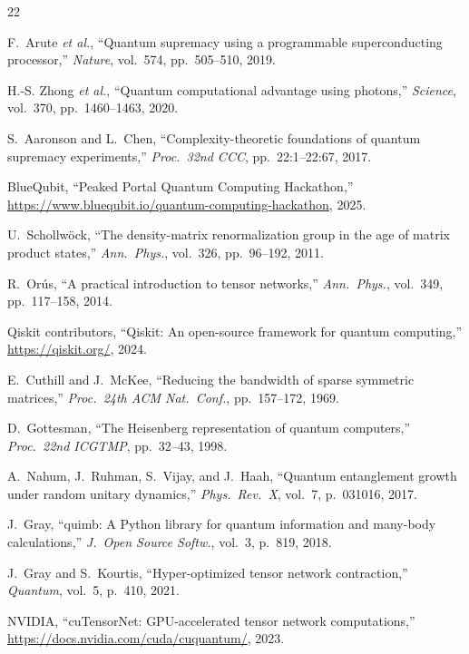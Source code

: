\documentclass[11pt,a4paper]{article}
\begin{document}
\begin{thebibliography}{22}

F.~Arute \emph{et al.},
``Quantum supremacy using a programmable superconducting processor,''
\emph{Nature}, vol.~574, pp.~505--510, 2019.

H.-S. Zhong \emph{et al.},
``Quantum computational advantage using photons,''
\emph{Science}, vol.~370, pp.~1460--1463, 2020.

S.~Aaronson and L.~Chen,
``Complexity-theoretic foundations of quantum supremacy experiments,''
\emph{Proc.\ 32nd CCC}, pp.~22:1--22:67, 2017.

BlueQubit,
``Peaked Portal Quantum Computing Hackathon,''
\url{https://www.bluequbit.io/quantum-computing-hackathon}, 2025.

U.~Schollw{\"o}ck,
``The density-matrix renormalization group in the age of matrix product states,''
\emph{Ann.\ Phys.}, vol.~326, pp.~96--192, 2011.

R.~Or{\'u}s,
``A practical introduction to tensor networks,''
\emph{Ann.\ Phys.}, vol.~349, pp.~117--158, 2014.

Qiskit contributors,
``Qiskit: An open-source framework for quantum computing,''
\url{https://qiskit.org/}, 2024.

E.~Cuthill and J.~McKee,
``Reducing the bandwidth of sparse symmetric matrices,''
\emph{Proc.\ 24th ACM Nat.\ Conf.}, pp.~157--172, 1969.

D.~Gottesman,
``The Heisenberg representation of quantum computers,''
\emph{Proc.\ 22nd ICGTMP}, pp.~32--43, 1998.

A.~Nahum, J.~Ruhman, S.~Vijay, and J.~Haah,
``Quantum entanglement growth under random unitary dynamics,''
\emph{Phys.\ Rev.\ X}, vol.~7, p.~031016, 2017.

J.~Gray,
``quimb: A Python library for quantum information and many-body calculations,''
\emph{J.\ Open Source Softw.}, vol.~3, p.~819, 2018.

J.~Gray and S.~Kourtis,
``Hyper-optimized tensor network contraction,''
\emph{Quantum}, vol.~5, p.~410, 2021.

NVIDIA,
``cuTensorNet: GPU-accelerated tensor network computations,''
\url{https://docs.nvidia.com/cuda/cuquantum/}, 2023.


\end{thebibliography}
\end{document}
